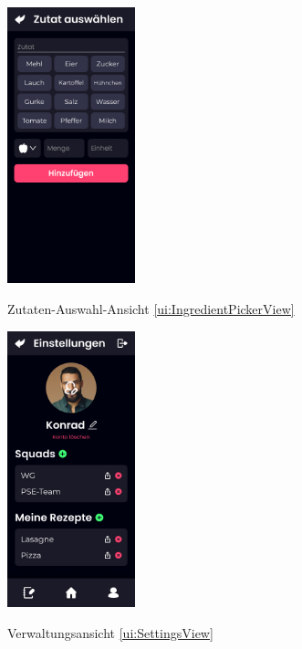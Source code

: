 \documentclass[parskip=full]{scrartcl}
\begin{document}
\begin{figure}[htp]
    \begin{minipage}
        [t]{0.49\textwidth}
        \centering
        \includegraphics[height=80mm]{images/ui/IngredientPickerView.jpg}
        \label{fig:IngredientPickerView}
        \caption{Zutaten-Auswahl-Ansicht \ref{ui:IngredientPickerView}}
    \end{minipage}
    \begin{minipage}
        [t]{0.49\textwidth}
        \centering
        \includegraphics[height=80mm]{images/ui/SettingsView.jpg}
        \label{fig:SettingsView}
        \caption{Verwaltungsansicht \ref{ui:SettingsView}}
    \end{minipage}
\end{figure}
\end{document}
